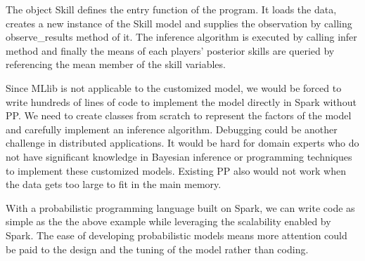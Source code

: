 The object Skill defines the entry function of the program. It loads the data, creates a new instance of the Skill model and supplies the observation by calling observe\_results method of it. The inference algorithm is executed by calling infer method and finally the means of each players' posterior skills are queried by referencing the mean member of the skill variables.

Since MLlib is not applicable to the customized model, we would be forced to write hundreds of lines of code to implement the model directly in Spark without PP. We need to create classes from scratch to represent the factors of the model and carefully implement an inference algorithm. Debugging could be another challenge in distributed applications. It would be hard for domain experts who do not have significant knowledge in Bayesian inference or programming techniques to implement these customized models. Existing PP also would not work when the data gets too large to fit in the main memory. 

With a probabilistic programming language built on Spark, we can write code as simple as the the above example while leveraging the scalability enabled by Spark. The ease of developing probabilistic models means more attention could be paid to the design and the tuning of the model rather than coding.

